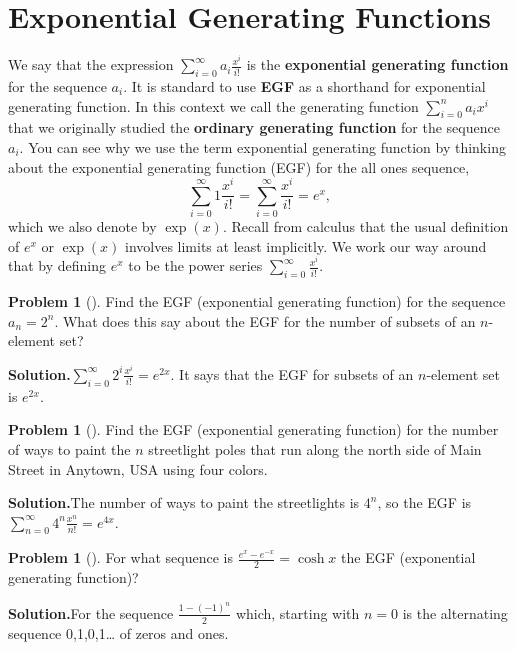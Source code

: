 \documentclass[10pt,]{book}
\newcommand{\terminology}[1]{\textbf{#1}}
\theoremstyle{plain}
\theoremstyle{definition}
\newtheorem{activity}[project]{Problem}
\theoremstyle{definition}
\numberwithin{equation}{chapter}
\begin{document}
\section[{Exponential Generating Functions}]{Exponential Generating Functions}\label{section-23}
We say that the expression \(\sum_{i=0}^\infty a_i\frac{x^i}{i!}\) is the \terminology{exponential generating function} for the sequence \(a_i\). It is standard to use \terminology{EGF} as a shorthand for exponential generating function. In this context we call the generating function \(\sum_{i=0}^n a_ix^i\) that we originally studied the \terminology{ordinary generating function} for the sequence \(a_i\). You can see why we use the term exponential generating function by thinking about the exponential generating function (EGF) for the all ones sequence,%
\begin{equation*}
\sum_{i=0}^\infty 1\frac{x^i}{i!} = \sum_{i=0}^\infty \frac{x^i}{i!}
=e^x,
\end{equation*}
which we also denote by \(\exp (x)\). Recall from calculus that the usual definition of \(e^x\) or \(\exp(x)\) involves limits at least implicitly. We work our way around that by defining \(e^x\) to be the power series \(\sum_{i=0}^\infty
\frac{x^i}{i!}\).%
\begin{activity}[]\label{egf2n}
Find the EGF (exponential generating function) for the sequence \(a_n=2^n\). What does this say about the EGF for the number of subsets of an \(n\)-element set?%
\par\medskip\noindent%
\textbf{Solution.}\quad \(\sum_{i=0}^\infty {2^i}\frac{x^i}{i!}=e^{2x}\). It says that the EGF for subsets of an \(n\)-element set is \(e^{2x}\).%
\end{activity}
\begin{activity}[]\label{paintinglightpoles}
Find the EGF (exponential generating function) for the number of ways to paint the \(n\) streetlight poles that run along the north side of Main Street in Anytown, USA using four colors.%
\par\medskip\noindent%
\textbf{Solution.}\quad The number of ways to paint the streetlights is \(4^n\), so the EGF is \(\sum_{n=0}^\infty 4^n\frac{x^n}{n!}=e^{4x}\).%
\end{activity}
\begin{activity}[]\label{activity-374}
For what sequence is \(\frac{e^x-e^{-x}}{2} =\cosh x\) the EGF (exponential generating function)?%
\par\medskip\noindent%
\textbf{Solution.}\quad For the sequence \(\frac{1-(-1)^n}{2}\) which, starting with \(n=0\) is the alternating sequence 0,1,0,1\dots{} of zeros and ones.%
\end{activity}
\end{document}
